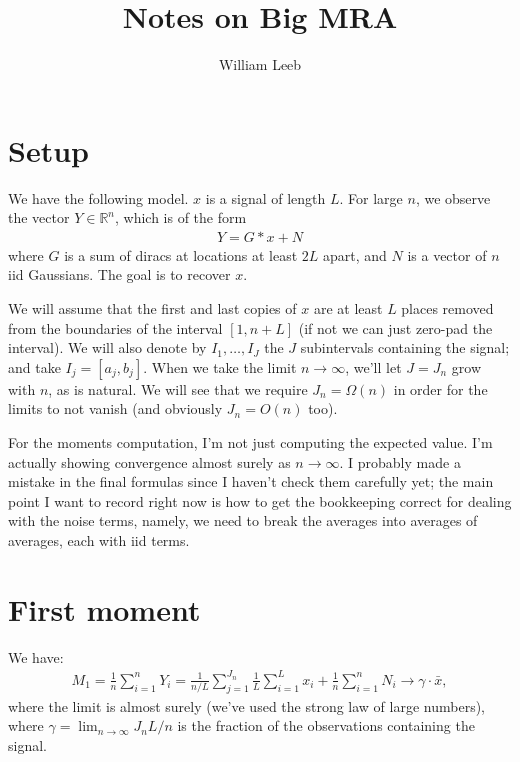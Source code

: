 \documentclass{article}
\theoremstyle{thm}
\theoremstyle{definition}
\newcommand{\1}{\mathbf{1}}
\begin{document}
\title{Notes on Big MRA}
\author{William Leeb}
\date{}
\maketitle

\section{Setup}

We have the following model. $x$ is a signal of length $L$. For large $n$, we observe the vector $Y \in \mathbb{R}^n$, which is of the form 
%
\begin{align}
%
    Y = G \ast x + N
%
\end{align}
%
where $G$ is a sum of diracs at locations at least $2L$ apart, and $N$ is a vector of $n$ iid Gaussians. The goal is to recover $x$.

We will assume that the first and last copies of $x$ are at least $L$ places removed from the boundaries of the interval $[1,n + L]$ (if not we can just zero-pad the interval). We will also denote by $I_1,\dots,I_J$ the $J$ subintervals containing the signal; and take $I_j = [a_j,b_j]$. When we take the limit $n \to \infty$, we'll let $J = J_n$ grow with $n$, as is natural. We will see that we require $J_n = \Omega(n)$ in order for the limits to not vanish (and obviously $J_n = O(n)$ too).

For the moments computation, I'm not just computing the expected value. I'm actually showing convergence almost surely as $n \to \infty$. I probably made a mistake in the final formulas since I haven't check them carefully yet; the main point I want to record right now is how to get the bookkeeping correct for dealing with the noise terms, namely, we need to break the averages into averages of averages, each with iid terms.

%
%
%

\section{First moment}

We have:
%
\begin{align}
%
    M_1 = \frac{1}{n} \sum_{i=1}^n Y_i
        = \frac{1}{n/L} \sum_{j=1}^{J_n} \frac{1}{L}\sum_{i=1}^L x_i
            + \frac{1}{n} \sum_{i=1}^n N_i
    \to \gamma \cdot \bar{x},
%
\end{align}
%
where the limit is almost surely (we've used the strong law of large numbers), where $\gamma = \lim_{n\to\infty} J_n L / n$ is the fraction of the observations containing the signal.
\end{document}
